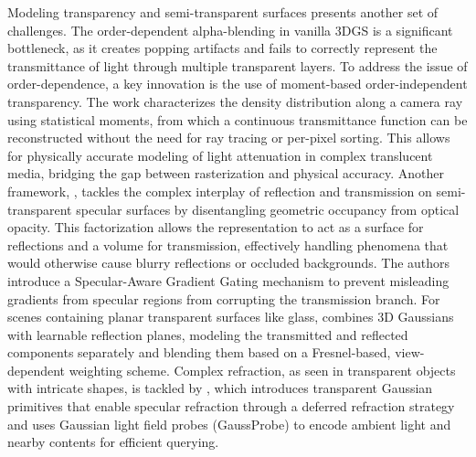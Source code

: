 \documentclass[11pt]{article}
\begin{document}
Modeling transparency and semi-transparent surfaces presents another set of challenges. The order-dependent alpha-blending in vanilla 3DGS is a significant bottleneck, as it creates popping artifacts and fails to correctly represent the transmittance of light through multiple transparent layers. To address the issue of order-dependence, a key innovation is the use of moment-based order-independent transparency. The work \cite{ref34} characterizes the density distribution along a camera ray using statistical moments, from which a continuous transmittance function can be reconstructed without the need for ray tracing or per-pixel sorting. This allows for physically accurate modeling of light attenuation in complex translucent media, bridging the gap between rasterization and physical accuracy. Another framework, \cite{ref71}, tackles the complex interplay of reflection and transmission on semi-transparent specular surfaces by disentangling geometric occupancy from optical opacity. This factorization allows the representation to act as a surface for reflections and a volume for transmission, effectively handling phenomena that would otherwise cause blurry reflections or occluded backgrounds. The authors introduce a Specular-Aware Gradient Gating mechanism to prevent misleading gradients from specular regions from corrupting the transmission branch. For scenes containing planar transparent surfaces like glass, \cite{ref607} combines 3D Gaussians with learnable reflection planes, modeling the transmitted and reflected components separately and blending them based on a Fresnel-based, view-dependent weighting scheme. Complex refraction, as seen in transparent objects with intricate shapes, is tackled by \cite{ref608}, which introduces transparent Gaussian primitives that enable specular refraction through a deferred refraction strategy and uses Gaussian light field probes (GaussProbe) to encode ambient light and nearby contents for efficient querying.
\end{document}
